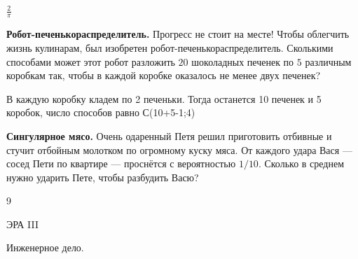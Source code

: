 \documentclass[12pt, addpoints]{exam} %
\begin{document}
\begin{questions}
\begin{solution}
$\frac{2}{\pi}  $
\end{solution}

\question \textbf{Робот-печенькораспределитель.} Прогресс не стоит на месте! Чтобы облегчить жизнь кулинарам, был изобретен робот-печенькораспределитель. Сколькими способами может этот робот разложить $20$ шоколадных печенек  по $5$ различным коробкам так, чтобы в каждой коробке оказалось не менее двух печенек?

\begin{solution}
В каждую коробку кладем по 2 печеньки. Тогда останется 10 печенек и 5 коробок, число способов равно С(10+5-1;4)
\end{solution}

\question \textbf{Сингулярное мясо.} Очень одаренный Петя решил приготовить отбивные и стучит отбойным молотком по огромному куску мяса. От каждого удара Вася --- сосед Пети по квартире --- проснётся с вероятностью $1/10$. Сколько в среднем нужно ударить Пете, чтобы разбудить Васю?
\begin{solution}
9
\end{solution}




\end{questions}


\newpage
\begin{center}
ЭРА III
\end{center}
\begin{center}
Инженерное дело.
\end{center}
\end{document}
